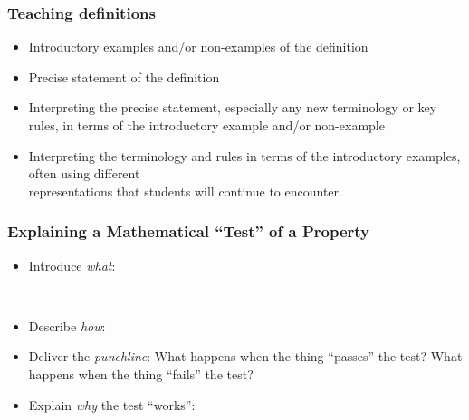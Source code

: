 \documentclass[11pt]{article}
\theoremstyle{definition}
\begin{document}
\subsubsection*{Teaching definitions}
	\begin{itemize}
	\item Introductory examples and/or non-examples of the definition
	\item Precise statement of the definition
	\item Interpreting the precise statement, especially any new terminology or key rules, in terms of the introductory example and/or non-example
	\item Interpreting the terminology and rules in terms of the introductory examples, often using different \\ representations that students will continue to encounter.
	\end{itemize}
	
\subsubsection*{Explaining a Mathematical ``Test'' of a Property}

\begin{itemize}
\item Introduce {\it what}:	
	 \vspace*{-12pt}$\;$

\item Describe {\it how}:

\item Deliver the {\it punchline}: What happens when the thing ``passes'' the test? What happens when the thing ``fails'' the test?
\item Explain {\it why} the test ``works'': 
\end{itemize}
\end{document}
